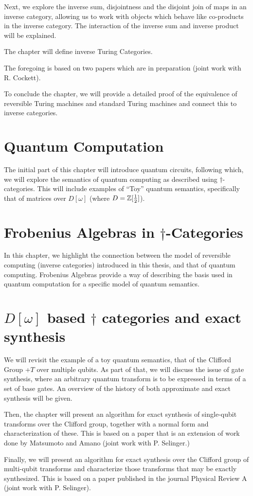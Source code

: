 Next, we explore the inverse sum, disjointness and the disjoint join of maps in an inverse
category, allowing us to work with objects which behave like co-products in the inverse category.
The interaction of the inverse sum and inverse product will be explained.

The chapter will define inverse Turing Categories.

The foregoing is based on two papers which are in preparation (joint work with R. Cockett).

To conclude the chapter, we will provide a detailed proof of the equivalence of reversible Turing
machines and standard Turing machines and connect this to inverse categories.

\section*{Quantum Computation}
The initial part of this chapter will introduce quantum circuits, following which, we will explore
the semantics of quantum computing as described using $\dagger$-categories. This will include
examples of ``Toy'' quantum semantics, specifically that of matrices over $D[\omega]$ (where
$D = \mathbb{Z}[\frac{1}{2}]$).

\section*{Frobenius Algebras in $\dagger$-Categories}

In this chapter, we highlight the connection between the model of reversible computing (inverse
categories) introduced in this thesis, and that of quantum computing. Frobenius Algebras provide a
way of describing the basis used in quantum computation for a specific model of quantum semantics.


\section*{$D[\omega]$ based $\dagger$ categories and exact synthesis}

We will revisit the example of a toy quantum semantics, that of the Clifford Group +$T$ over
multiple qubits. As part of that, we will discuss the issue of gate synthesis, where an arbitrary
quantum transform is to be expressed in terms of a set of base gates. An overview of the history of
both approximate and exact synthesis will be given.

Then, the chapter will present an algorithm for exact synthesis of single-qubit transforms over the
Clifford group, together with a normal form and characterization of these. This is based on a paper
that is an extension of work done by Matsumoto and Amano (joint work with P. Selinger.)

Finally, we will present an algorithm for exact synthesis over the Clifford group of multi-qubit
transforms and characterize those transforms that may be exactly synthesized. This is based on a
paper published in the journal Physical Review A (joint work with P. Selinger).

